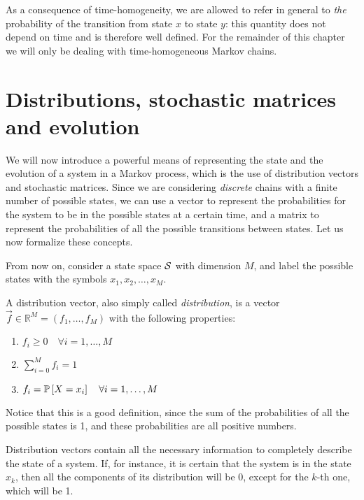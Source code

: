 As a consequence of time-homogeneity, we are allowed to refer in general to \emph{the} probability of the transition from state $x$ to state $y$: this quantity does not depend on time and is therefore well defined. For the remainder of this chapter we will only be dealing with time-homogeneous Markov chains.

\section{Distributions, stochastic matrices and evolution}
We will now introduce a powerful means of representing the state and the evolution of a system in a Markov process, which is the use of distribution vectors and stochastic matrices. Since we are considering \emph{discrete} chains with a finite number of possible states, we can use a vector to represent the probabilities for the system to be in the possible states at a certain time, and a matrix to represent the probabilities of all the possible transitions between states. Let us now formalize these concepts.

\smallskip
From now on, consider a state space $\mathcal{S}$ with dimension $M$, and label the possible states with the symbols $x_1, x_2, \dots, x_M$.

\begin{ndef} \label{def:distribution}
    A distribution vector, also simply called \emph{distribution}, is a vector $\vec{f} \in \mathbb{R}^M = (f_1, \dots, f_M)$ with the following properties:
    \begin{center}
        \begin{enumerate}
            \item $f_i \geq 0 \quad \forall i = 1,\dots, M$
            \item $\sum_{i=0}^M f_i = 1$
            \item $f_i = \mathbb{P}\left[X = x_i\right] \quad \forall i = 1,\dots, M$
        \end{enumerate}
    \end{center}
    Notice that this is a good definition, since the sum of the probabilities of all the possible states is 1, and these probabilities are all positive numbers.
\end{ndef}

Distribution vectors contain all the necessary information to completely describe the state of a system. If, for instance, it is certain that the system is in the state $x_k$, then all the components of its distribution will be 0, except for the $k$-th one, which will be 1.


